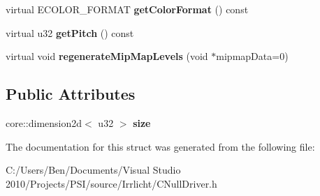 \begin{DoxyCompactItemize}
\item 
\hypertarget{structirr_1_1video_1_1_c_null_driver_1_1_s_dummy_texture_a37d0c1313275d21f03e094f906dc5213}{virtual E\-C\-O\-L\-O\-R\-\_\-\-F\-O\-R\-M\-A\-T {\bfseries get\-Color\-Format} () const }\label{structirr_1_1video_1_1_c_null_driver_1_1_s_dummy_texture_a37d0c1313275d21f03e094f906dc5213}

\item 
\hypertarget{structirr_1_1video_1_1_c_null_driver_1_1_s_dummy_texture_a7aace85439ec9670edfc2cbaf389ba6f}{virtual u32 {\bfseries get\-Pitch} () const }\label{structirr_1_1video_1_1_c_null_driver_1_1_s_dummy_texture_a7aace85439ec9670edfc2cbaf389ba6f}

\item 
\hypertarget{structirr_1_1video_1_1_c_null_driver_1_1_s_dummy_texture_ad7406da99fe88d73dd1e9a6224fa6c6a}{virtual void {\bfseries regenerate\-Mip\-Map\-Levels} (void $\ast$mipmap\-Data=0)}\label{structirr_1_1video_1_1_c_null_driver_1_1_s_dummy_texture_ad7406da99fe88d73dd1e9a6224fa6c6a}

\end{DoxyCompactItemize}
\subsection*{Public Attributes}
\begin{DoxyCompactItemize}
\item 
\hypertarget{structirr_1_1video_1_1_c_null_driver_1_1_s_dummy_texture_a34864d4e1f693d1f9f332a721bc2af38}{core\-::dimension2d$<$ u32 $>$ {\bfseries size}}\label{structirr_1_1video_1_1_c_null_driver_1_1_s_dummy_texture_a34864d4e1f693d1f9f332a721bc2af38}

\end{DoxyCompactItemize}


The documentation for this struct was generated from the following file\-:\begin{DoxyCompactItemize}
\item 
C\-:/\-Users/\-Ben/\-Documents/\-Visual Studio 2010/\-Projects/\-P\-S\-I/source/\-Irrlicht/C\-Null\-Driver.\-h\end{DoxyCompactItemize}
